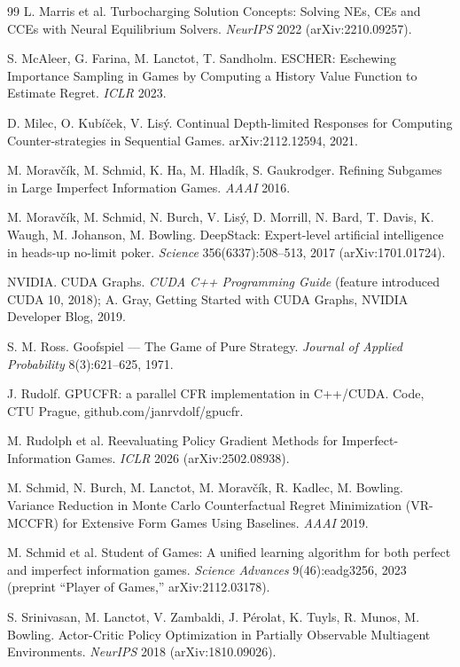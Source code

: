 \documentclass[11pt]{article}
\begin{document}
\begin{thebibliography}{99}
 L. Marris et al. Turbocharging Solution Concepts: Solving NEs, CEs
and CCEs with Neural Equilibrium Solvers. \emph{NeurIPS} 2022 (arXiv:2210.09257).

 S. McAleer, G. Farina, M. Lanctot, T. Sandholm. ESCHER: Eschewing
Importance Sampling in Games by Computing a History Value Function to Estimate Regret.
\emph{ICLR} 2023.

 D. Milec, O. Kubíček, V. Lisý. Continual Depth-limited Responses for
Computing Counter-strategies in Sequential Games. arXiv:2112.12594, 2021.

 M. Moravčík, M. Schmid, K. Ha, M. Hladík, S. Gaukrodger. Refining
Subgames in Large Imperfect Information Games. \emph{AAAI} 2016.

 M. Moravčík, M. Schmid, N. Burch, V. Lisý, D. Morrill, N. Bard,
T. Davis, K. Waugh, M. Johanson, M. Bowling. DeepStack: Expert-level artificial
intelligence in heads-up no-limit poker. \emph{Science} 356(6337):508--513, 2017
(arXiv:1701.01724).

 NVIDIA. CUDA Graphs. \emph{CUDA C++ Programming Guide} (feature
introduced CUDA 10, 2018); A. Gray, Getting Started with CUDA Graphs, NVIDIA Developer
Blog, 2019.

 S. M. Ross. Goofspiel --- The Game of Pure Strategy.
\emph{Journal of Applied Probability} 8(3):621--625, 1971.

 J. Rudolf. GPUCFR: a parallel CFR implementation in C++/CUDA. Code,
CTU Prague, github.com/janrvdolf/gpucfr.

 M. Rudolph et al. Reevaluating Policy Gradient Methods for
Imperfect-Information Games. \emph{ICLR} 2026 (arXiv:2502.08938).

 M. Schmid, N. Burch, M. Lanctot, M. Moravčík, R. Kadlec, M.
Bowling. Variance Reduction in Monte Carlo Counterfactual Regret Minimization
(VR-MCCFR) for Extensive Form Games Using Baselines. \emph{AAAI} 2019.

 M. Schmid et al. Student of Games: A unified learning algorithm for
both perfect and imperfect information games. \emph{Science Advances} 9(46):eadg3256,
2023 (preprint ``Player of Games,'' arXiv:2112.03178).

 S. Srinivasan, M. Lanctot, V. Zambaldi, J. Pérolat, K. Tuyls,
R. Munos, M. Bowling. Actor-Critic Policy Optimization in Partially Observable
Multiagent Environments. \emph{NeurIPS} 2018 (arXiv:1810.09026).


\end{thebibliography}
\end{document}
